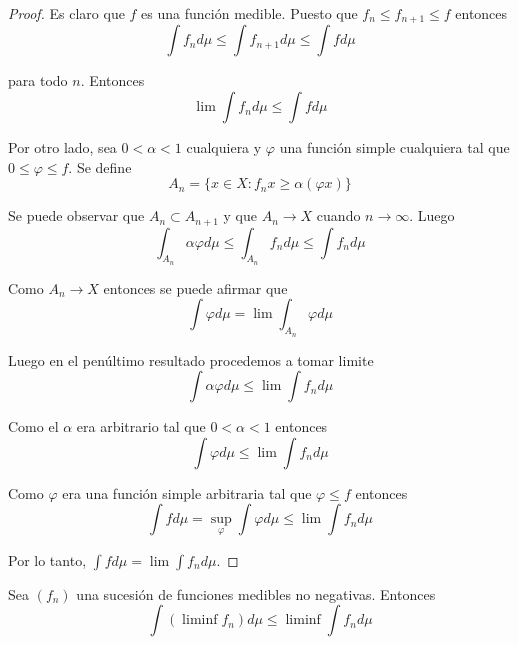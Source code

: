 \begin{proof}
	Es claro que $f$ es una función medible. Puesto que $f_n \leq f_{n+1} \leq f$ entonces
	\begin{equation}
		\int f_n d\mu \leq \int f_{n+1} d\mu \leq \int f d\mu
	\end{equation}
	
	para todo $n$. Entonces
	\begin{equation}
		\lim \int f_n d\mu \leq \int f d\mu
	\end{equation}
	
	Por otro lado, sea $0 < \alpha < 1$ cualquiera y $\varphi$ una función simple cualquiera tal que $0 \leq \varphi \leq f$. Se define
	\begin{equation}
		A_n = \{ x \in X: f_n x \geq \alpha (\varphi x) \}
	\end{equation}
	
	Se puede observar que $A_n \subset A_{n+1}$ y que $A_n \rightarrow X$ cuando $n \rightarrow \infty$. Luego
	\begin{equation}
		\int_{A_n} \alpha \varphi d\mu \leq \int_{A_n} f_n d\mu \leq \int f_n d\mu
	\end{equation}
	
	Como $A_n \rightarrow X$ entonces se puede afirmar que
	\begin{equation}
		\int \varphi d\mu = \lim \int_{A_n} \varphi d\mu
	\end{equation}
	
	Luego en el penúltimo resultado procedemos a tomar limite
	\begin{equation}
		\int \alpha \varphi d\mu \leq \lim \int f_n d\mu
	\end{equation}
	
	Como el $\alpha$ era arbitrario tal que $0 < \alpha < 1$ entonces
	\begin{equation}
		\int \varphi d\mu \leq \lim \int f_n d\mu
	\end{equation}
	
	Como $\varphi$ era una función simple arbitraria tal que $\varphi \leq f$ entonces
	\begin{equation}
		\int f d\mu = \sup_\varphi \int \varphi d\mu \leq \lim \int f_n d\mu
	\end{equation}
	
	Por lo tanto, $\int f d\mu = \lim \int f_n d\mu$.
\end{proof}

\begin{teorema}\label{fatou}
	Sea $(f_n)$ una sucesión de funciones medibles no negativas. Entonces
	\begin{equation}
		\int (\liminf f_n) d\mu \leq \liminf \int f_n d\mu
	\end{equation}
\end{teorema}

